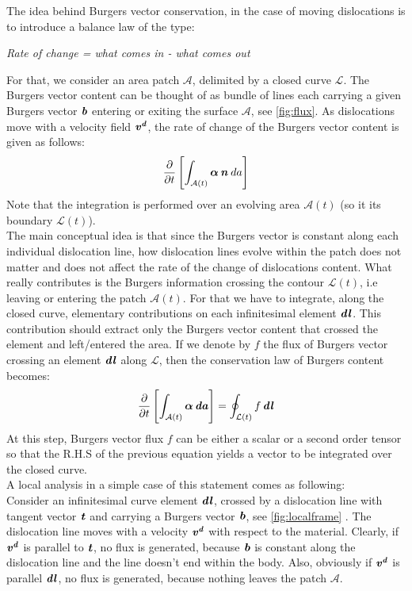 \documentclass{article}
\begin{document}
The idea behind Burgers vector conservation, in the case of moving dislocations is to introduce a balance law of the type:
\begin{center}
    \emph{Rate of change = what comes in - what comes out}
\end{center}
For that, we consider an area patch $\mathcal{A}$, delimited by a closed curve $\mathcal{L}$. The Burgers vector content can be thought of as bundle of lines each carrying a given Burgers vector $\bm{\mathit{b}}$ entering or exiting the surface $\mathcal{A}$, see \cref{fig:flux}. As dislocations move with a velocity field $\bm{\mathit{v^d}}$, the rate of change of the Burgers vector content is given as follows:
\begin{equation}
    \frac{\partial}{\partial t}\left[ \int_{\mathcal{A}(t)} \bm{\mathit{\alpha}}\,\bm{\mathit{n}}\: da \right]
\end{equation}
Note that the integration is performed over an evolving area $\mathcal{A}(t)$ (so it its boundary $\mathcal{L}(t)$).\\
The main conceptual idea is that since the Burgers vector is constant along each individual dislocation line, how dislocation lines evolve within the patch does not matter and does not affect the rate of the change of dislocations content. What really contributes is the Burgers information crossing the contour $\mathcal{L}(t)$, i.e leaving or entering the patch $\mathcal{A}(t)$. For that we have to integrate, along the closed curve, elementary contributions on each infinitesimal element $\bm{\mathit{dl}}$. This contribution should extract only the Burgers vector content that crossed the element and left/entered the area. If we denote by $f$ the flux of Burgers vector crossing an element $\bm{\mathit{dl}}$ along $\mathcal{L}$, then the conservation law of Burgers content becomes:
\begin{equation}\label{eq:balance0}
    \frac{\partial}{\partial t}\left[ \int_{\mathcal{A}(t)} \bm{\mathit{\alpha}}\,\bm{\mathit{da}} \right] = \oint_{\mathcal{L}(t)} f\, \bm{\mathit{dl}}
\end{equation}
At this step, Burgers vector flux $f$ can be either a scalar or a second order tensor so that the R.H.S of the previous equation yields a vector to be integrated over the closed curve.\\

A local analysis in a simple case of this statement comes as following:\\
Consider an infinitesimal curve element $\bm{\mathit{dl}}$, crossed by a dislocation line with tangent vector $\bm{\mathit{t}}$ and carrying a Burgers vector $\bm{\mathit{b}}$, see \cref{fig:localframe} . The dislocation line moves with a velocity $\bm{\mathit{v^d}}$ with respect to the material. Clearly, if $\bm{\mathit{v^d}}$ is parallel to $\bm{\mathit{t}}$, no flux is generated, because $\bm{\mathit{b}}$ is constant along the dislocation line and the line doesn't end within the body. Also, obviously if $\bm{\mathit{v^d}}$ is parallel $\bm{\mathit{dl}}$, no flux is generated, because nothing leaves the patch $\mathcal{A}$.\\
\end{document}
